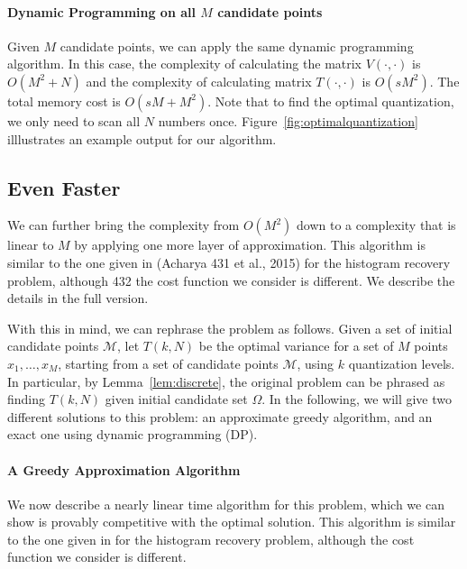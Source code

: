 \vspace{-0.5em}
\paragraph*{Dynamic Programming on all $M$ candidate points}
Given $M$ candidate points, we can apply the same dynamic
programming algorithm. 
In this case,
the complexity of calculating the 
matrix $V(\cdot, \cdot)$ is $O(M^2 + N)$ and the 
complexity of calculating matrix $T(\cdot, \cdot)$ is $O(sM^2)$. The total memory cost is $O(sM + M^2)$. Note that to find the optimal quantization, we only need to scan all $N$ numbers once.
Figure~\ref{fig:optimalquantization} illlustrates
an example output for our algorithm.

\vspace{-0.5em}
\subsection{Even Faster}
\vspace{-0.5em}

We can further bring the complexity from $O(M^2)$
down to a complexity that is linear to $M$ by applying
one more layer of approximation. This algorithm is similar 
to the one given in (Acharya 431 et al., 2015) for the histogram recovery problem, although 432 the cost function 
we consider is different.
We describe the details in the full version.



\iffalse
With this in mind, we can rephrase the problem as follows. 
Given a set of initial candidate points $\mathcal{M}$, 
let $T(k, N)$ be the optimal variance for a set of $M$ points $x_1, \ldots, x_M$, 
starting from a set of candidate points $\mathcal{M}$, using $k$ quantization levels. 
In particular, by Lemma~\ref{lem:discrete}, the original problem can be phrased as finding $T(k, N)$ given initial candidate set $\Omega$. 
In the following, we will give two different solutions to this problem: an approximate greedy algorithm, and an exact one using dynamic programming (DP). 

 \paragraph*{A Greedy Approximation Algorithm}
We now describe a nearly linear time algorithm for this problem, which we can show is provably competitive with the optimal solution.
This algorithm is similar to the one given in \cite{ADHLS15} for the histogram recovery problem, although the cost function we consider is different. 

